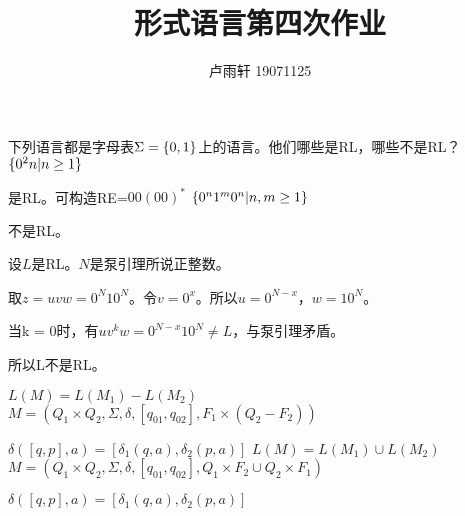 \documentclass{ctexart}
\title{形式语言第四次作业}
\author{卢雨轩 19071125}
\DeclarePairedDelimiter{\set}{\{}{\}}
\begin{document}
\maketitle

\begin{outline}[enumerate]
    \1[2.] 下列语言都是字母表$\Sigma = \set{0, 1}$上的语言。他们哪些是RL，哪些不是RL？
        \2[(1)] $\set{0^2n | n \ge 1}$

            是RL。可构造RE=$00(00)^*$
        \2[(3)] $\set{0^n1^m0^n | n, m \ge 1}$

            不是RL。

            设$L$是RL。$N$是泵引理所说正整数。

            取$z = uvw = 0^N10^N$。令$v = 0^x$。所以$u = 0^{N-x}$，$w = 10^N$。

            当k = 0时，有$uv^kw = 0^{N-x}10^N \ne L$，与泵引理矛盾。

            所以L不是RL。

    \1[11.] 
        \2[(3)] $L(M) = L(M_1) - L(M_2)$
            $M = (Q_1 \times Q_2, \Sigma, \delta, [q_{01}, q_{02}], F_1 \times (Q_2 - F_2))$

            $\delta([q, p], a) = [\delta_1(q, a), \delta_2(p, a)]$
        \2[(4)] $L(M) = L(M_1) \cup L(M_2)$
        $M = (Q_1 \times Q_2, \Sigma, \delta, [q_{01}, q_{02}], Q_1 \times F_2 \cup Q_2 \times F_1)$

        $\delta([q, p], a) = [\delta_1(q, a), \delta_2(p, a)]$
\end{outline}
\end{document}
